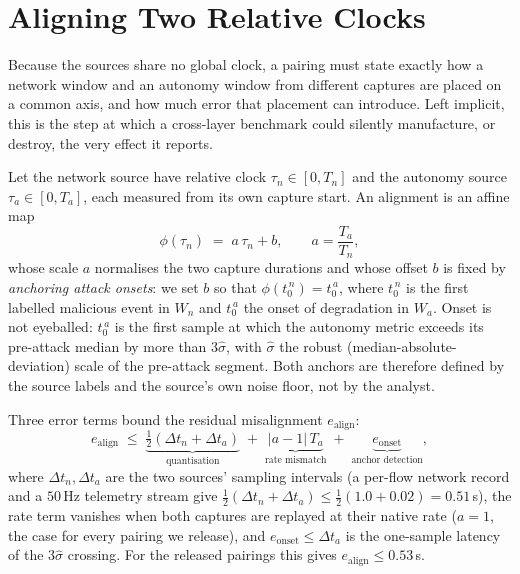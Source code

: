 \section{Aligning Two Relative Clocks}
\label{app:alignment}
Because the sources share no global clock, a  pairing
must state exactly how a network window and an autonomy window from different
captures are placed on a common axis, and how much error that placement can
introduce. Left implicit, this is the step at which a cross-layer benchmark
could silently manufacture, or destroy, the very effect it reports.

Let the network source have relative clock $\tau_n\in[0,T_n]$ and the autonomy
source $\tau_a\in[0,T_a]$, each measured from its own capture start. An
alignment is an affine map
\begin{equation}
\label{eq:align}
\phi(\tau_n) \;=\; a\,\tau_n + b, \qquad a=\frac{T_a}{T_n},
\end{equation}
whose scale $a$ normalises the two capture durations and whose offset $b$ is
fixed by \emph{anchoring attack onsets}: we set $b$ so that
$\phi(t_0^{\,n}) = t_0^{\,a}$, where $t_0^{\,n}$ is the first labelled malicious
event in $W_n$ and $t_0^{\,a}$ the onset of degradation in $W_a$. Onset is not
eyeballed: $t_0^{\,a}$ is the first sample at which the autonomy metric exceeds
its pre-attack median by more than $3\hat\sigma$, with $\hat\sigma$ the robust
(median-absolute-deviation) scale of the pre-attack segment. Both anchors are
therefore defined by the source labels and the source's own noise floor, not by
the analyst.

Three error terms bound the residual misalignment $e_{\mathrm{align}}$:
\begin{equation}
\label{eq:align_err}
e_{\mathrm{align}} \;\le\; \underbrace{\tfrac{1}{2}(\Delta t_n+\Delta t_a)}_{\text{quantisation}}
\;+\;\underbrace{|a-1|\,T_a}_{\text{rate mismatch}}
\;+\;\underbrace{e_{\mathrm{onset}}}_{\text{anchor detection}},
\end{equation}
where $\Delta t_n,\Delta t_a$ are the two sources' sampling intervals (a per-flow
network record and a $50$\,Hz telemetry stream give
$\tfrac12(\Delta t_n+\Delta t_a)\le\tfrac12(1.0+0.02)=0.51$\,s), the rate term
vanishes when both captures are replayed at their native rate ($a=1$, the case
for every pairing we release), and $e_{\mathrm{onset}}\le\Delta t_a$ is the
one-sample latency of the $3\hat\sigma$ crossing. For the released
 pairings this gives
$e_{\mathrm{align}}\le0.53$\,s.

